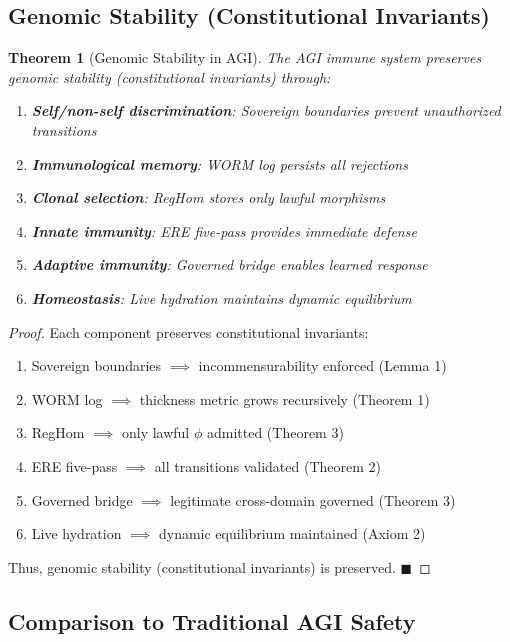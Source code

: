 \documentclass[11pt,a4paper]{article}
\newtheorem{theorem}{Theorem}[section]
\begin{document}
\subsection{Genomic Stability (Constitutional Invariants)}

\begin{theorem}[Genomic Stability in AGI]\label{thm:genomic_stability}
The AGI immune system preserves genomic stability (constitutional invariants) through:
\begin{enumerate}
    \item \textbf{Self/non-self discrimination}: Sovereign boundaries prevent unauthorized transitions
    \item \textbf{Immunological memory}: WORM log persists all rejections
    \item \textbf{Clonal selection}: RegHom stores only lawful morphisms
    \item \textbf{Innate immunity}: ERE five-pass provides immediate defense
    \item \textbf{Adaptive immunity}: Governed bridge enables learned response
    \item \textbf{Homeostasis}: Live hydration maintains dynamic equilibrium
\end{enumerate}
\end{theorem}

\begin{proof}
Each component preserves constitutional invariants:
\begin{enumerate}
    \item Sovereign boundaries $\implies$ incommensurability enforced (Lemma 1)
    \item WORM log $\implies$ thickness metric grows recursively (Theorem 1)
    \item RegHom $\implies$ only lawful $\phi$ admitted (Theorem 3)
    \item ERE five-pass $\implies$ all transitions validated (Theorem 2)
    \item Governed bridge $\implies$ legitimate cross-domain governed (Theorem 3)
    \item Live hydration $\implies$ dynamic equilibrium maintained (Axiom 2)
\end{enumerate}

Thus, genomic stability (constitutional invariants) is preserved. \hfill $\blacksquare$
\end{proof}

\subsection{Comparison to Traditional AGI Safety}
\end{document}
